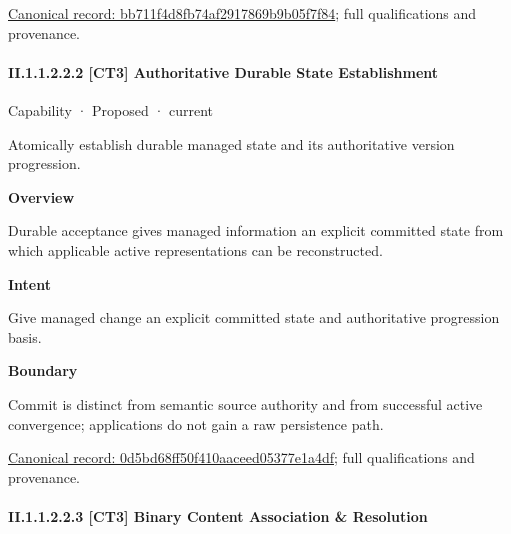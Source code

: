 {\footnotesize \href{../../../../../../../continuum/strategy/capability/bb711f4d8fb74af2917869b9b05f7f84.md}{Canonical record: bb711f4d8fb74af2917869b9b05f7f84}; full qualifications and provenance.}\par
\paragraph*{II.1.1.2.2.2 [CT3] Authoritative Durable State Establishment}
\label{navigation:II.1.1.2.2.2}

\label{element:0d5bd68ff50f410aaceed05377e1a4df}
{\small Capability · Proposed · current}\par

Atomically establish durable managed state and its authoritative version progression.



\textbf{Overview}



Durable acceptance gives managed information an explicit committed state from which applicable active representations can be reconstructed.



\textbf{Intent}



Give managed change an explicit committed state and authoritative progression basis.



\textbf{Boundary}



Commit is distinct from semantic source authority and from successful active convergence; applications do not gain a raw persistence path.


{\footnotesize \href{../../../../../../../continuum/strategy/capability/0d5bd68ff50f410aaceed05377e1a4df.md}{Canonical record: 0d5bd68ff50f410aaceed05377e1a4df}; full qualifications and provenance.}\par
\paragraph*{II.1.1.2.2.3 [CT3] Binary Content Association \& Resolution}
\label{navigation:II.1.1.2.2.3}

